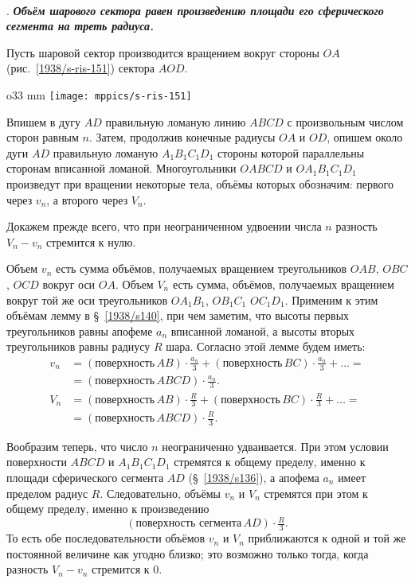 \paragraph{}\label{1938/s143} 
.
\textbf{\emph{Объём шарового сектора равен произведению площади его сферического сегмента на треть радиуса.}}

Пусть шаровой сектор производится вращением вокруг стороны $OA$ (рис.~\ref{1938/s-ris-151}) сектора $AOD$.

\begin{wrapfigure}{o}{33 mm}
\vskip-0mm
\centering
\texttt{[image: mppics/s-ris-151]}
\caption{}\label{1938/s-ris-151}
\vskip-0mm
\end{wrapfigure}

Впишем в дугу $AD$ правильную ломаную линию $ABCD$ с произвольным числом сторон равным $n$.
Затем, продолжив конечные радиусы $OA$ и $OD$, опишем около дуги $AD$ правильную ломаную $A_1B_1C_1D_1$ стороны которой параллельны сторонам вписанной ломаной.
Многоугольники $OABCD$ и $OA_1B_1C_1D_1$ произведут при вращении некоторые тела, объёмы которых обозначим: первого через $v_n$, а второго через $V_n$.

Докажем прежде всего, что при неограниченном удвоении числа $n$ разность $V_n-v_n$ стремится к нулю.

Объем $v_n$ есть сумма объёмов, получаемых вращением треугольников $OAB$, $OBC$, $OCD$ вокруг оси $OA$.
Объем $V_n$ есть сумма, объёмов, получаемых вращением вокруг той же оси треугольников $OA_1B_1$, $OB_1C_1$ $OC_1D_1$.
Применим к этим объёмам лемму в §~\ref{1938/s140}, при чем заметим, что высоты первых треугольников равны апофеме $a_n$ вписанной ломаной, а высоты вторых треугольников равны радиусу $R$ шара.
Согласно этой лемме будем иметь:
\begin{align*}
v_n&=
(\text{поверхность}\, AB)\cdot\tfrac {a_n}3
+
(\text{поверхность}\, BC)\cdot\tfrac {a_n}3
+
\dots=
\\
&=
(\text{поверхность}\, ABCD)\cdot \tfrac {a_n}3.
\\
V_n&=
(\text{поверхность}\, AB)\cdot\tfrac R3
+
(\text{поверхность}\, BC)\cdot\tfrac R3
+
\dots=
\\
&=
(\text{поверхность}\, ABCD)\cdot \tfrac R3.
\end{align*}


Вообразим теперь, что число $n$ неограниченно удваивается.
При этом условии поверхности $ABCD$ и $A_1B_1C_1D_1$ стремятся к общему пределу, именно к площади сферического сегмента $AD$ (§~\ref{1938/s136}), а апофема $a_n$ имеет пределом радиус $R$.
Следовательно, объёмы $v_n$ и $V_n$ стремятся при этом к общему пределу, именно к произведению 
\[(\text{поверхность сегмента}\,  AD)\cdot \tfrac R3.\]
То есть обе последовательности объёмов $v_n$ и $V_n$ приближаются к одной и той же постоянной величине как угодно близко; это возможно только тогда, когда разность $V_n-v_n$ стремится к $0$.

